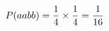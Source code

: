 \documentclass[preview]{standalone}
\begin{document}
\begin{align*}
\special{dvisvgm:raw <g id='unique000'>}P(aabb) = \frac{1}{4} \times \frac{1}{4} = \frac{1}{16}\special{dvisvgm:raw </g>}
\end{align*}
\end{document}
